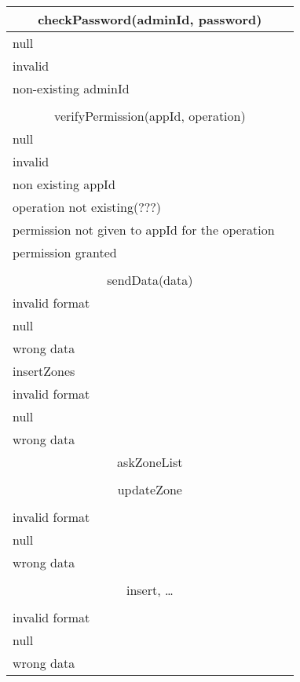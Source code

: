 \documentclass[11pt,oneside,a4paper]{report}
\begin{document}
\begin{tabular}{p{5cm}|p{6cm}}
	\hline
	\multicolumn{2}{c}{checkPassword(adminId, password)}\\\hline
	
	null\\\hline invalid\\\hline
	non-existing adminId\\\hline\\\hline
	
	\multicolumn{2}{c}{	 verifyPermission(appId, operation)}\\\hline

	null\\\hline invalid\\\hline
	non existing appId\\\hline operation not existing(???)\\\hline
	permission not given to appId for the operation\\\hline
	permission granted\\\hline\\\hline
	
	\multicolumn{2}{c}{
	 sendData(data)}\\\hline
	invalid format\\\hline null\\\hline
	wrong data\\\hline
	insertZones\\\hline
	invalid format\\\hline null\\\hline
	wrong data\\\hline
	
	\multicolumn{2}{c}{askZoneList}\\\hline
	\\\hline

	\multicolumn{2}{c}{updateZone}\\\hline
	\\\hline
	invalid format	\\\hline null	\\\hline
	wrong data	\\\hline	\\\hline
	
	\multicolumn{2}{c}{insert, …}\\\hline\\\hline
	invalid format\\\hline null\\\hline
	wrong data\\\hline
\end{tabular}
\end{document}
